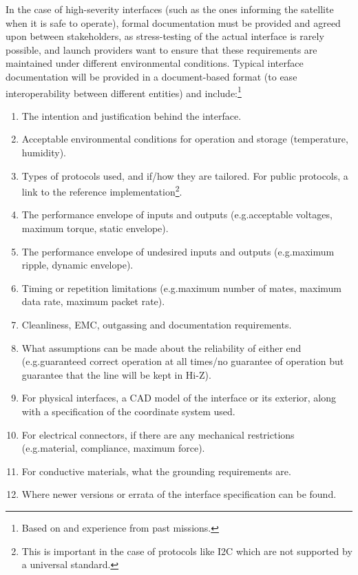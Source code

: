 \documentclass[a4paper,nobib,justified,final]{tufte-book}
\begin{document}
In the case of high-severity interfaces (such as the ones informing the satellite when it is safe to operate), formal documentation must be provided and agreed upon between stakeholders, as stress-testing of the actual interface is rarely possible, and launch providers want to ensure that these requirements are maintained under different environmental conditions. Typical interface documentation will be provided in a document-based format (to ease interoperability between different entities) and include:\footnote{Based on \cite{gerstenmaierInternationalDockingSystem2016} and experience from past missions.}
\begin{enumerate}[itemsep=-2ex]
	\item The intention and justification behind the interface.
	\item Acceptable environmental conditions for operation and storage (temperature, humidity).
	\item Types of protocols used, and if/how they are tailored. For public protocols, a link to the reference implementation\footnote{This is important in the case of protocols like \acs{I2C} which are not supported by a universal standard.}.
	\item The performance envelope of inputs and outputs (e.g.\@ acceptable voltages, maximum torque, static envelope).
	\item The performance envelope of undesired inputs and outputs (e.g.\@ maximum ripple, dynamic envelope).
	\item Timing or repetition limitations (e.g.\@ maximum number of mates, maximum data rate, maximum packet rate).
	\item Cleanliness, \acs{EMC}, outgassing and documentation requirements.
	\item What assumptions can be made about the reliability of either end (e.g.\@ guaranteed correct operation at all times/no guarantee of operation but guarantee that the line will be kept in Hi-Z).
	\item For physical interfaces, a \acs{CAD} model of the interface or its exterior, along with a specification of the coordinate system used.
	\item For electrical connectors, if there are any mechanical restrictions (e.g.\@ material, compliance, maximum force).
	\item For conductive materials, what the grounding requirements are.
	\item Where newer versions or errata of the interface specification can be found.
\end{enumerate}
\end{document}
